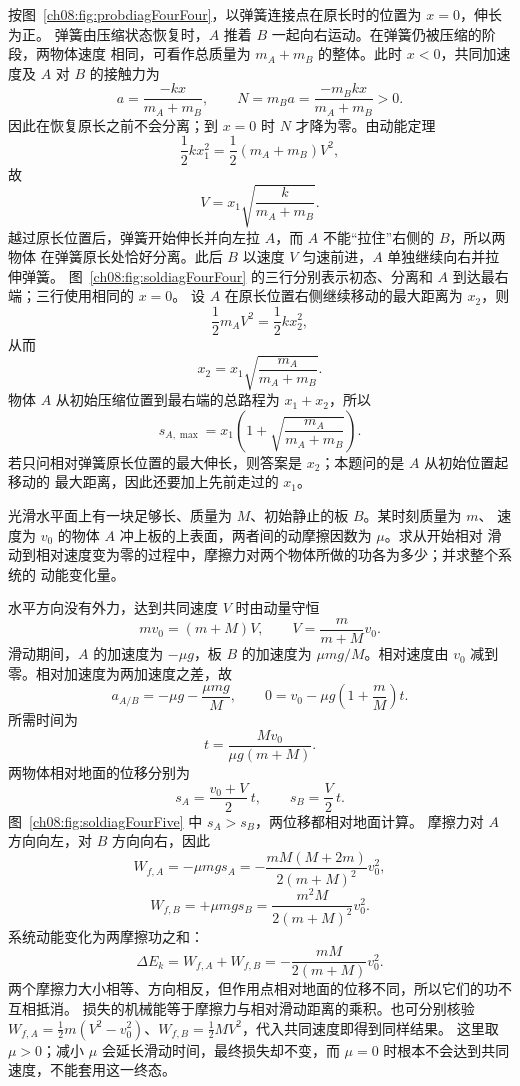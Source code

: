{\begin{xesolution}
按图~\ref{ch08:fig:probdiagFourFour}，以弹簧连接点在原长时的位置为 $x=0$，伸长为正。
弹簧由压缩状态恢复时，$A$ 推着 $B$ 一起向右运动。在弹簧仍被压缩的阶段，两物体速度
相同，可看作总质量为 $m_A+m_B$ 的整体。此时 $x<0$，共同加速度及 $A$ 对 $B$ 的接触力为
\[
 a=\frac{-kx}{m_A+m_B},\qquad N=m_Ba=\frac{-m_Bkx}{m_A+m_B}>0.
\]
因此在恢复原长之前不会分离；到 $x=0$ 时 $N$ 才降为零。由动能定理
\[
 \frac12kx_1^2
 =\frac12(m_A+m_B)V^2,
\]
故
\[
 V=x_1\sqrt{\frac{k}{m_A+m_B}}.
\]
越过原长位置后，弹簧开始伸长并向左拉 $A$，而 $A$ 不能“拉住”右侧的 $B$，所以两物体
在弹簧原长处恰好分离。此后 $B$ 以速度 $V$ 匀速前进，$A$ 单独继续向右并拉伸弹簧。
\soldiagFourFour
图~\ref{ch08:fig:soldiagFourFour} 的三行分别表示初态、分离和 $A$ 到达最右端；三行使用相同的 $x=0$。
设 $A$ 在原长位置右侧继续移动的最大距离为 $x_2$，则
\[
 \frac12m_AV^2=\frac12kx_2^2,
\]
从而
\[
 x_2=x_1\sqrt{\frac{m_A}{m_A+m_B}}.
\]
物体 $A$ 从初始压缩位置到最右端的总路程为 $x_1+x_2$，所以
\[
 \boxed{
 s_{A,\max}=x_1\left(1+\sqrt{\frac{m_A}{m_A+m_B}}\right)}.
\]
若只问相对弹簧原长位置的最大伸长，则答案是 $x_2$；本题问的是 $A$ 从初始位置起移动的
最大距离，因此还要加上先前走过的 $x_1$。
\end{xesolution}

\begin{origexamplebox}{}\label{ch08:ex:s10-4-5}
光滑水平面上有一块足够长、质量为 $M$、初始静止的板 $B$。某时刻质量为 $m$、
速度为 $v_0$ 的物体 $A$ 冲上板的上表面，两者间的动摩擦因数为 $\mu$。求从开始相对
滑动到相对速度变为零的过程中，摩擦力对两个物体所做的功各为多少；并求整个系统的
动能变化量。

\ThQSlidingBoard
\end{origexamplebox}

\begin{xesolution}
水平方向没有外力，达到共同速度 $V$ 时由动量守恒
\[
 mv_0=(m+M)V,
 \qquad
 V=\frac{m}{m+M}v_0.
\]
滑动期间，$A$ 的加速度为 $-\mu g$，板 $B$ 的加速度为 $\mu mg/M$。相对速度由
$v_0$ 减到零。相对加速度为两加速度之差，故
\[
 a_{A/B}=-\mu g-\frac{\mu mg}{M},\qquad
 0=v_0-\mu g\left(1+\frac mM\right)t.
\]
所需时间为
\[
 t=\frac{Mv_0}{\mu g(m+M)}.
\]
两物体相对地面的位移分别为
\[
 s_A=\frac{v_0+V}{2}\,t,
 \qquad
 s_B=\frac{V}{2}\,t.
\]
\soldiagFourFive
图~\ref{ch08:fig:soldiagFourFive} 中 $s_A>s_B$，两位移都相对地面计算。
摩擦力对 $A$ 方向向左，对 $B$ 方向向右，因此
\[
 \boxed{
 W_{f,A}=-\mu mgs_A
 =-\frac{mM(M+2m)}{2(m+M)^2}v_0^2},
\]
\[
 \boxed{
 W_{f,B}=+\mu mgs_B
 =\frac{m^2M}{2(m+M)^2}v_0^2}.
\]
系统动能变化为两摩擦功之和：
\[
 \boxed{
 \Delta E_k=W_{f,A}+W_{f,B}
 =-\frac{mM}{2(m+M)}v_0^2}.
\]
两个摩擦力大小相等、方向相反，但作用点相对地面的位移不同，所以它们的功不互相抵消。
损失的机械能等于摩擦力与相对滑动距离的乘积。也可分别核验
$W_{f,A}=\tfrac12m(V^2-v_0^2)$、$W_{f,B}=\tfrac12MV^2$，代入共同速度即得到同样结果。
这里取 $\mu>0$；减小 $\mu$ 会延长滑动时间，最终损失却不变，而 $\mu=0$ 时根本不会达到共同速度，不能套用这一终态。
\end{xesolution}

}
